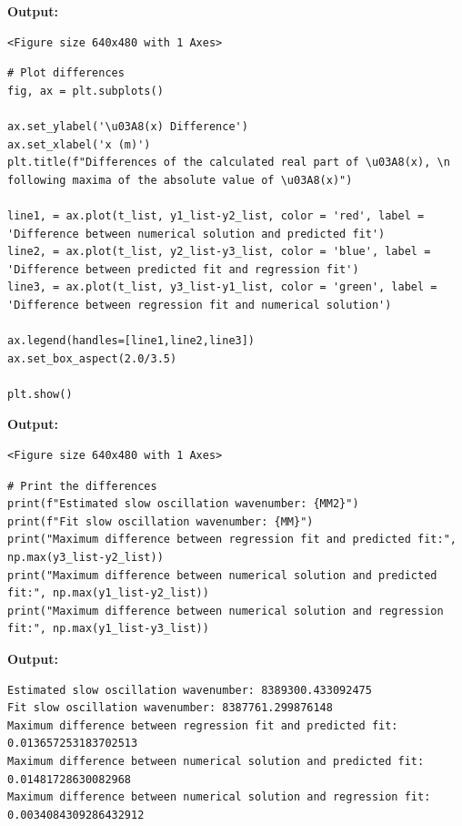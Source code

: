 \documentclass{article}
\begin{document}
\textbf{Output:}\begin{verbatim}
<Figure size 640x480 with 1 Axes>
\end{verbatim}

\begin{lstlisting}
# Plot differences
fig, ax = plt.subplots()

ax.set_ylabel('\u03A8(x) Difference')
ax.set_xlabel('x (m)')
plt.title(f"Differences of the calculated real part of \u03A8(x), \n following maxima of the absolute value of \u03A8(x)")

line1, = ax.plot(t_list, y1_list-y2_list, color = 'red', label = 'Difference between numerical solution and predicted fit')
line2, = ax.plot(t_list, y2_list-y3_list, color = 'blue', label = 'Difference between predicted fit and regression fit')
line3, = ax.plot(t_list, y3_list-y1_list, color = 'green', label = 'Difference between regression fit and numerical solution')

ax.legend(handles=[line1,line2,line3])
ax.set_box_aspect(2.0/3.5)

plt.show()\end{lstlisting}

\textbf{Output:}\begin{verbatim}
<Figure size 640x480 with 1 Axes>
\end{verbatim}

\begin{lstlisting}
# Print the differences
print(f"Estimated slow oscillation wavenumber: {MM2}")
print(f"Fit slow oscillation wavenumber: {MM}")
print("Maximum difference between regression fit and predicted fit:", np.max(y3_list-y2_list))
print("Maximum difference between numerical solution and predicted fit:", np.max(y1_list-y2_list))
print("Maximum difference between numerical solution and regression fit:", np.max(y1_list-y3_list))\end{lstlisting}

\textbf{Output:}\begin{verbatim}
Estimated slow oscillation wavenumber: 8389300.433092475
Fit slow oscillation wavenumber: 8387761.299876148
Maximum difference between regression fit and predicted fit: 0.013657253183702513
Maximum difference between numerical solution and predicted fit: 0.01481728630082968
Maximum difference between numerical solution and regression fit: 0.0034084309286432912

\end{verbatim}
\end{document}
